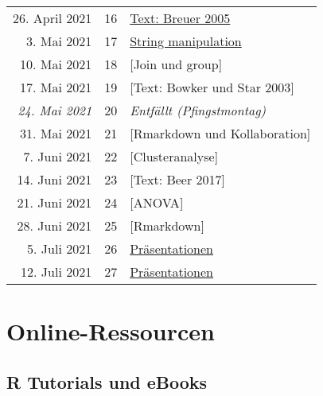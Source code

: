 \documentclass[
  ngerman,
]{article}
\begin{document}
\begin{longtable}[]{@{}rrl@{}}
26. April 2021 & 16 & \protect\hyperlink{text-breuer-2005}{Text: Breuer 2005} \\
3. Mai 2021 & 17 & \protect\hyperlink{string-manipulation}{String manipulation} \\
10. Mai 2021 & 18 & {[}Join und group{]} \\
17. Mai 2021 & 19 & {[}Text: Bowker und Star 2003{]} \\
\emph{24. Mai 2021} & 20 & \emph{Entfällt (Pfingstmontag)} \\
31. Mai 2021 & 21 & {[}Rmarkdown und Kollaboration{]} \\
7. Juni 2021 & 22 & {[}Clusteranalyse{]} \\
14. Juni 2021 & 23 & {[}Text: Beer 2017{]} \\
21. Juni 2021 & 24 & {[}ANOVA{]} \\
28. Juni 2021 & 25 & {[}Rmarkdown{]} \\
5. Juli 2021 & 26 & \protect\hyperlink{pruxe4sentationen}{Präsentationen} \\
12. Juli 2021 & 27 & \protect\hyperlink{pruxe4sentationen}{Präsentationen} \\
\bottomrule
\end{longtable}

\hypertarget{online-ressourcen}{%
\section*{Online-Ressourcen}\label{online-ressourcen}}

\hypertarget{r-tutorials-und-ebooks}{%
\subsection*{R Tutorials und eBooks}\label{r-tutorials-und-ebooks}}
\end{document}
